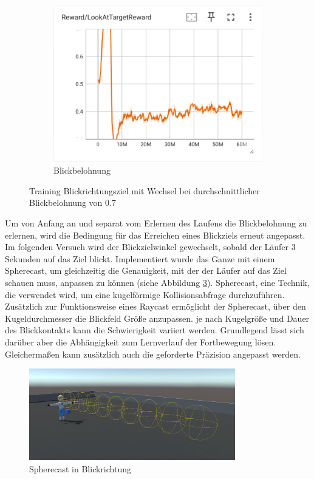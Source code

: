 \begin{figure}[H]
\begin{subfigure}{.49\textwidth}
      \centering  
      \includegraphics[width=\textwidth]{img/113_look_reward}
      \caption{Blickbelohnung}
      \label{fig:113_look_reward}
    \end{subfigure}
  \caption{Training Blickrichtungsziel mit Wechsel bei durchschnittlicher Blickbelohnung von 0.7}
  \label{fig:training_blickrichtungsziel_wechsel_07}
\end{figure}

Um von Anfang an und separat vom Erlernen des Laufens die Blickbelohnung zu erlernen, wird die Bedingung für das Erreichen eines Blickziels erneut angepasst. Im folgenden Versuch wird der Blickzielwinkel gewechselt, sobald der Läufer 3 Sekunden auf das Ziel blickt. Implementiert wurde das Ganze mit einem Spherecast, um gleichzeitig die Genauigkeit, mit der der Läufer auf das Ziel schauen muss, anpassen zu können (siehe Abbildung \ref{fig:spherecast}). Spherecast, eine Technik, die verwendet wird, um eine kugelförmige Kollisionsabfrage durchzuführen. Zusätzlich zur Funktionsweise eines Raycast ermöglicht der Spherecast, über den Kugeldurchmesser die Blickfeld Größe anzupassen. je nach Kugelgröße und Dauer des Blickkontakts kann die Schwierigkeit variiert werden. Grundlegend lässt sich darüber aber die Abhängigkeit zum Lernverlauf der Fortbewegung lösen. Gleichermaßen kann zusätzlich auch die geforderte Präzision angepasst werden.

\begin{figure}[H]
  \centering  
  \includegraphics[width=0.8\textwidth]{img/spherecast}
  \caption{Spherecast in Blickrichtung}
  \label{fig:spherecast}
\end{figure}

